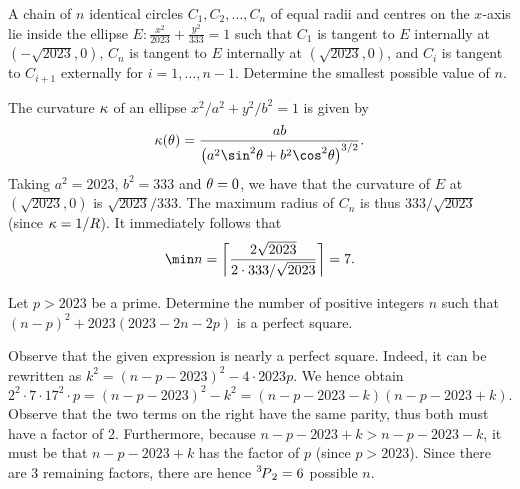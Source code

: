 \begin{question}[7]\label{A::2023-O-1-24}
    A chain of $n$ identical circles $C_1, C_2, \ldots, C_n$ of equal radii and centres on the $x$-axis lie inside the ellipse $E: \frac{x^2}{2023} + \frac{y^2}{333} = 1$ such that $C_1$ is tangent to $E$ internally at $(-\sqrt{2023}, 0)$, $C_n$ is tangent to $E$ internally at $(\sqrt{2023}, 0)$, and $C_i$ is tangent to $C_{i+1}$ externally for $i = 1, \ldots , n-1$. Determine the smallest possible value of $n$.
\end{question}
\begin{solution*}
    The curvature $\kappa$ of an ellipse $x^2/a^2 + y^2/b^2 = 1$ is given by \[\k(\t) = \frac{ab}{\bp{a^2\sin^2\t + b^2\cos^2\t}^{3/2}}.\] Taking $a^2 = 2023$, $b^2 = 333$ and $\theta = 0$, we have that the curvature of $E$ at $(\sqrt{2023}, 0)$ is $\sqrt{2023}/333$. The maximum radius of $C_n$ is thus $333/\sqrt{2023}$ (since $\kappa = 1/R$). It immediately follows that \[\min n = \ceil{\frac{2\sqrt{2023}}{2 \cdot 333/\sqrt{2023}}} = 7.\]
\end{solution*}
    
\begin{question}[6]\label{A::2023-O-1-25}
    Let $p > 2023$ be a prime. Determine the number of positive integers $n$ such that $(n-p)^2 + 2023(2023 - 2n - 2p)$ is a perfect square.
\end{question}
\begin{solution*}
    Observe that the given expression is nearly a perfect square. Indeed, it can be rewritten as $k^2 = (n-p-2023)^2 - 4 \cdot 2023 p$. We hence obtain \[2^2 \cdot 7 \cdot 17^2 \cdot p = (n-p-2023)^2 - k^2 = (n-p-2023-k)(n-p-2023+k).\] Observe that the two terms on the right have the same parity, thus both must have a factor of 2. Furthermore, because $n-p-2023 + k > n-p-2023-k$, it must be that $n-p-2023+k$ has the factor of $p$ (since $p > 2023$). Since there are 3 remaining factors, there are hence $\prescript{3\mkern-2.5mu}{}P_{2} = 6$ possible $n$.
\end{solution*}